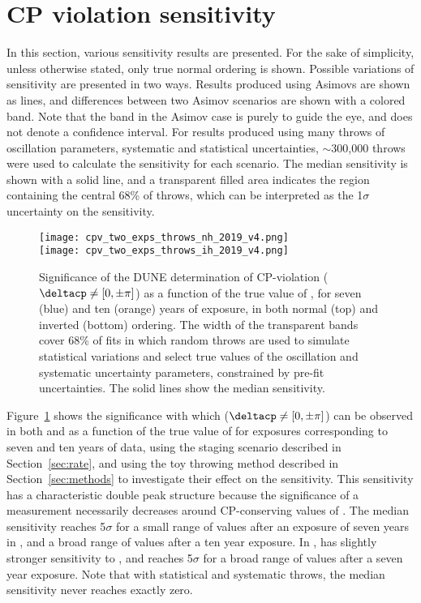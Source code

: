 \section{CP violation sensitivity}
\label{sec:cp_sens}

In this section, various sensitivity results are presented. For the sake of simplicity, unless otherwise stated, only true normal ordering is shown. Possible variations of sensitivity are presented in two ways. Results produced using Asimovs are shown as lines, and differences between two Asimov scenarios are shown with a colored band. Note that the band in the Asimov case is purely to guide the eye, and does not denote a confidence interval. For results produced using many throws of oscillation parameters, systematic and statistical uncertainties, $\sim$300,000 throws were used to calculate the sensitivity for each scenario. The median sensitivity is shown with a solid line, and a transparent filled area indicates the region containing the central 68\% of throws, which can be interpreted as the 1$\sigma$ uncertainty on the sensitivity.

\begin{figure}[htbp]
  \centering
  \texttt{[image: cpv\_two\_exps\_throws\_nh\_2019\_v4.png]}\\
  \texttt{[image: cpv\_two\_exps\_throws\_ih\_2019\_v4.png]}
  \caption[Significance of the DUNE determination of CP-violation as a function of \deltacp in both  and ]{Significance of the DUNE determination of CP-violation ($\deltacp \neq [0,\pm\pi]$) as a function of the true value of \deltacp, for seven (blue) and ten (orange) years of exposure, in both normal (top) and inverted (bottom) ordering. The width of the transparent bands cover 68\% of fits in which random throws are used to simulate statistical variations and select true values of the oscillation and systematic uncertainty parameters, constrained by pre-fit uncertainties. The solid lines show the median sensitivity.}
  \label{fig:cpv_nominal}
\end{figure}
Figure~\ref{fig:cpv_nominal} shows the significance with which  ($\deltacp \neq [0, \pm\pi]$) can be observed in both  and  as a
function of the true value of \deltacp for exposures corresponding to seven and ten years of data, using the staging scenario described in Section~\ref{sec:rate}, and using the toy throwing method described in Section~\ref{sec:methods} to investigate their effect on the sensitivity.
This sensitivity has a characteristic double peak
structure because the significance of a  measurement
necessarily decreases around CP-conserving values of \deltacp.
The median  sensitivity reaches 5$\sigma$ for a small range of values after an exposure of seven years in , and a broad range of values after a ten year exposure. In ,  has slightly stronger sensitivity to , and reaches 5$\sigma$ for a broad range of values after a seven year exposure.
Note that with statistical and systematic throws, the median sensitivity never reaches exactly zero.
